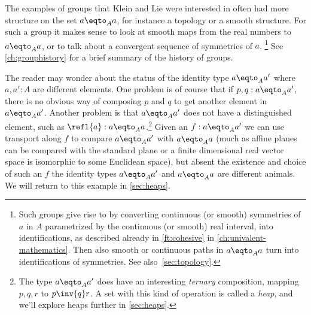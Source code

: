 The examples of groups that Klein and Lie were interested in
often had more structure on the set $a\eqto_A a$,
for instance a topology or a smooth structure.
For such a group it makes sense to look at smooth maps from the real numbers
to $a\eqto_A a$, or to talk about a convergent sequence of symmetries of $a$.
\footnote{%
  Such groups give rise to \inftygps by converting
  continuous (or smooth) symmetries of $a$ in $A$
  parametrized by the continuous (or smooth) real interval,
  into identifications,
  as described already in \cref{ft:cohesive}
  in \cref{ch:univalent-mathematics}.
  Then also smooth or continuous paths in $a\eqto_A a$
  turn into identifications of symmetries.
  See also~\cref{sec:topology}.}
See \cref{ch:grouphistory} for a brief summary of the history of groups.

\begin{remark}\label{rem:heap-preview}
  The reader may wonder about the status of the identity type 
  $a\eqto_A a'$ where $a,a':A$ are different elements.
  One problem is of course that if $p,q:a\eqto_A a'$,
  there is no obvious way of composing $p$ and $q$
  to get another element in $a\eqto_A a'$.
  Another problem is that $a\eqto_A a'$ does not have a distinguished element,
  such as $\refl{a}:a\eqto_A a$.\footnote{%
    The type $a\eqto_A a'$ does have an interesting \emph{ternary}
    composition, mapping $p,q,r$ to $p\inv{q}r$.
    A set with this kind of operation is called a \emph{heap},
    and we'll explore heaps further in \cref{sec:heaps}.}
Given an $f:a\eqto_A a'$ we can use transport along $f$ to compare 
$a\eqto_A a'$ with $a\eqto_A a$ (much as affine planes can be compared 
with the standard plane or a finite dimensional real vector space is 
isomorphic to some Euclidean space), but absent the existence and choice 
of such an $f$ the identity types $a\eqto_Aa'$ and $a\eqto_Aa$ are 
different animals.
We will return to this example in \cref{sec:heaps}.
\end{remark}


